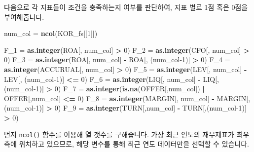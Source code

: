 \documentclass[12pt,]{book}
\newenvironment{Shaded}{\begin{snugshade}}{\end{snugshade}}
\newcommand{\DecValTok}[1]{\textcolor[rgb]{0.00,0.00,0.81}{#1}}
\newcommand{\KeywordTok}[1]{\textcolor[rgb]{0.13,0.29,0.53}{\textbf{#1}}}
\newcommand{\NormalTok}[1]{#1}
\newcommand{\OperatorTok}[1]{\textcolor[rgb]{0.81,0.36,0.00}{\textbf{#1}}}
\newcommand{\StringTok}[1]{\textcolor[rgb]{0.31,0.60,0.02}{#1}}
\begin{document}
다음으로 각 지표들이 조건을 충족하는지 여부를 판단하여, 지표 별로 1점 혹은 0점을 부여해줍니다.

\begin{Shaded}
\begin{Highlighting}[]
\NormalTok{num_col =}\StringTok{ }\KeywordTok{ncol}\NormalTok{(KOR_fs[[}\DecValTok{1}\NormalTok{]])}

\NormalTok{F_}\DecValTok{1}\NormalTok{ =}\StringTok{ }\KeywordTok{as.integer}\NormalTok{(ROA[, num_col] }\OperatorTok{>}\StringTok{ }\DecValTok{0}\NormalTok{)}
\NormalTok{F_}\DecValTok{2}\NormalTok{ =}\StringTok{ }\KeywordTok{as.integer}\NormalTok{(CFO[, num_col] }\OperatorTok{>}\StringTok{ }\DecValTok{0}\NormalTok{)}
\NormalTok{F_}\DecValTok{3}\NormalTok{ =}\StringTok{ }\KeywordTok{as.integer}\NormalTok{(ROA[, num_col] }\OperatorTok{-}\StringTok{ }\NormalTok{ROA[, (num_col}\DecValTok{-1}\NormalTok{)] }\OperatorTok{>}\StringTok{ }\DecValTok{0}\NormalTok{)}
\NormalTok{F_}\DecValTok{4}\NormalTok{ =}\StringTok{ }\KeywordTok{as.integer}\NormalTok{(ACCURUAL[, num_col] }\OperatorTok{>}\StringTok{ }\DecValTok{0}\NormalTok{) }
\NormalTok{F_}\DecValTok{5}\NormalTok{ =}\StringTok{ }\KeywordTok{as.integer}\NormalTok{(LEV[, num_col] }\OperatorTok{-}\StringTok{ }\NormalTok{LEV[, (num_col}\DecValTok{-1}\NormalTok{)] }\OperatorTok{<=}\StringTok{ }\DecValTok{0}\NormalTok{) }
\NormalTok{F_}\DecValTok{6}\NormalTok{ =}\StringTok{ }\KeywordTok{as.integer}\NormalTok{(LIQ[, num_col] }\OperatorTok{-}\StringTok{ }\NormalTok{LIQ[, (num_col}\DecValTok{-1}\NormalTok{)] }\OperatorTok{>}\StringTok{ }\DecValTok{0}\NormalTok{)}
\NormalTok{F_}\DecValTok{7}\NormalTok{ =}\StringTok{ }\KeywordTok{as.integer}\NormalTok{(}\KeywordTok{is.na}\NormalTok{(OFFER[,num_col]) }\OperatorTok{|}
\StringTok{                   }\NormalTok{OFFER[,num_col] }\OperatorTok{<=}\StringTok{ }\DecValTok{0}\NormalTok{)}
\NormalTok{F_}\DecValTok{8}\NormalTok{ =}\StringTok{ }\KeywordTok{as.integer}\NormalTok{(MARGIN[, num_col] }\OperatorTok{-}
\StringTok{                   }\NormalTok{MARGIN[, (num_col}\DecValTok{-1}\NormalTok{)] }\OperatorTok{>}\StringTok{ }\DecValTok{0}\NormalTok{)}
\NormalTok{F_}\DecValTok{9}\NormalTok{ =}\StringTok{ }\KeywordTok{as.integer}\NormalTok{(TURN[,num_col] }\OperatorTok{-}\StringTok{ }\NormalTok{TURN[,(num_col}\DecValTok{-1}\NormalTok{)] }\OperatorTok{>}\StringTok{ }\DecValTok{0}\NormalTok{)}
\end{Highlighting}
\end{Shaded}

먼저 \texttt{ncol()} 함수를 이용해 열 갯수를 구해줍니다. 가장 최근 연도의 재무제표가 최우측에 위치하고 있으므로, 해당 변수를 통해 최근 연도 데이터만을 선택할 수 있습니다.
\end{document}
